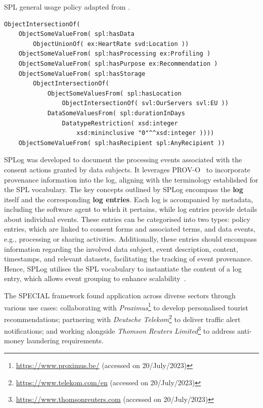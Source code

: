 \begin{listing}
\caption[SPL general usage policy.]{SPL general usage policy adapted from \cite{bonatti_special_2019}.}
\label{list:spl_example}
\begin{verbatim}
ObjectIntersectionOf(
    ObjectSomeValueFrom( spl:hasData
        ObjectUnionOf( ex:HeartRate svd:Location ))
    ObjectSomeValueFrom( spl:hasProcessing ex:Profiling )
    ObjectSomeValueFrom( spl:hasPurpose ex:Recommendation )
    ObjectSomeValueFrom( spl:hasStorage
        ObjectIntersectionOf(
            ObjectSomeValuesFrom( spl:hasLocation
                ObjectIntersectionOf( svl:OurServers svl:EU ))
            DataSomeValuesFrom( spl:durationInDays
                DatatypeRestriction( xsd:integer
                    xsd:mininclusive "0"^^xsd:integer ))))
    ObjectSomeValueFrom( spl:hasRecipient spl:AnyRecipient ))
\end{verbatim}
\end{listing}

SPLog was developed to document the processing events associated with the consent actions granted by data subjects.
It leverages PROV-O~\citep{lebo_prov-o_2013} to incorporate provenance information into the log, aligning with the terminology established for the SPL vocabulary. 
The key concepts outlined by SPLog encompass the \textbf{log} itself and the corresponding \textbf{log entries}.
Each log is accompanied by metadata, including the software agent to which it pertains, while log entries provide details about individual events. 
These entries can be categorised into two types: policy entries, which are linked to consent forms and associated terms, and data events, e.g., processing or sharing activities. 
Additionally, these entries should encompass information regarding the involved data subject, event description, content, timestamps, and relevant datasets, facilitating the tracking of event provenance.
Hence, SPLog utilises the SPL vocabulary to instantiate the content of a log entry, which allows event grouping to enhance scalability~\citep{kirrane_transparency_2018}.

The SPECIAL framework found application across diverse sectors through various use cases: collaborating with \textit{Proximus}\footnote{\url{https://www.proximus.be/} (accessed on 20/July/2023)} to develop personalised tourist recommendations; partnering with \textit{Deutsche Telekom}\footnote{\url{https://www.telekom.com/en} (accessed on 20/July/2023)} to deliver traffic alert notifications; and working alongside \textit{Thomson Reuters Limited}\footnote{\url{https://www.thomsonreuters.com} (accessed on 20/July/2023)} to address anti-money laundering requirements.

